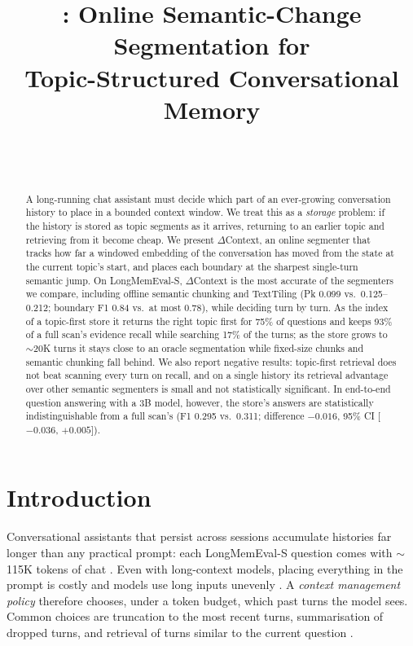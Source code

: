 \documentclass[11pt]{article}
\title{\dc: Online Semantic-Change Segmentation for\\Topic-Structured Conversational Memory}
\author{\pending{Author names}\\\pending{Affiliation}\\\texttt{\pending{email}}}
\date{}
\newcommand{\dc}{$\Delta$Context}
\begin{document}
\maketitle

\begin{abstract}
A long-running chat assistant must decide which part of an ever-growing
conversation history to place in a bounded context window. We treat this as a
\emph{storage} problem: if the history is stored as topic segments as it
arrives, returning to an earlier topic and retrieving from it become cheap. We
present \dc{}, an online segmenter that tracks how far a windowed embedding of
the conversation has moved from the state at the current topic's start, and
places each boundary at the sharpest single-turn semantic jump. On
LongMemEval-S, \dc{} is the most accurate of the segmenters we compare,
including offline semantic chunking and TextTiling (Pk 0.099 vs.\ 0.125--0.212;
boundary F1 0.84 vs.\ at most 0.78), while deciding turn by turn. As the index
of a topic-first store it returns the right topic first for 75\% of questions
and keeps 93\% of a full scan's evidence recall while searching 17\% of the
turns; as the store grows to $\sim$20K turns it stays close to an oracle
segmentation while fixed-size chunks and semantic chunking fall behind. We
also report negative results: topic-first retrieval does not beat scanning
every turn on recall, and on a single history its retrieval advantage over
other semantic segmenters is small and not statistically significant. In
end-to-end question answering with a 3B model, however, the store's answers
are statistically indistinguishable from a full scan's (F1 0.295 vs.\ 0.311;
difference $-0.016$, 95\% CI [$-0.036$, $+0.005$]).
\end{abstract}

\section{Introduction}

Conversational assistants that persist across sessions accumulate histories
far longer than any practical prompt: each LongMemEval-S question comes with
$\sim$115K tokens of chat \citep{wu2025longmemeval}. Even with long-context
models, placing everything in the prompt is costly and models use long inputs
unevenly \citep{liu2024lost}. A \emph{context management policy} therefore
chooses, under a token budget, which past turns the model sees. Common choices
are truncation to the most recent turns, summarisation of dropped turns, and
retrieval of turns similar to the current question
\citep{lewis2020rag,packer2023memgpt,zhong2024memorybank,chhikara2025mem0}.
\end{document}

